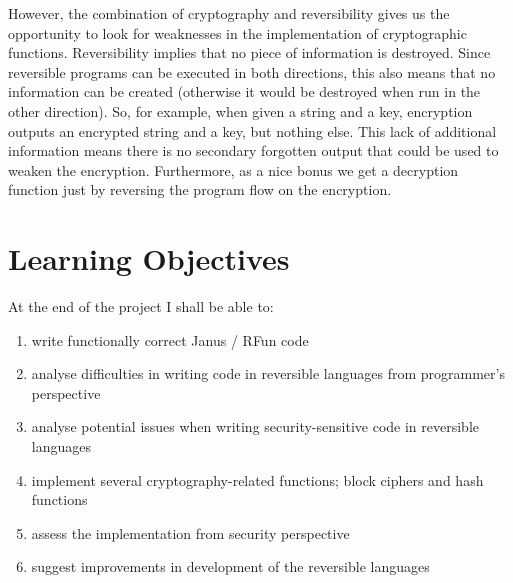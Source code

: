 \documentclass[a4paper]{article}
\begin{document}
However, the combination of cryptography and reversibility gives us the 
opportunity to look for weaknesses in the implementation of 
cryptographic functions. Reversibility implies that no piece of 
information is destroyed. Since reversible programs can be executed in 
both directions, this also means that no information can be created 
(otherwise it would be destroyed when run in the other direction). So, 
for example, when given a string and a key, encryption outputs an 
encrypted string and a key, but nothing else. This lack of additional 
information means there is no secondary forgotten output that could be 
used to weaken the encryption. Furthermore, as a nice bonus we get a 
decryption function just by reversing the program flow on the 
encryption.

\newpage

\section*{Learning Objectives}

At the end of the project I shall be able to:
\begin{enumerate}
\item write functionally correct Janus / RFun code
\item analyse difficulties in writing code in reversible languages from programmer's perspective
\item analyse potential issues when writing security-sensitive code in reversible languages
\item implement several cryptography-related functions; block ciphers and hash functions
\item assess the implementation from security perspective
\item suggest improvements in development of the reversible languages
\end{enumerate}

\nocite{*} %


\end{document}
